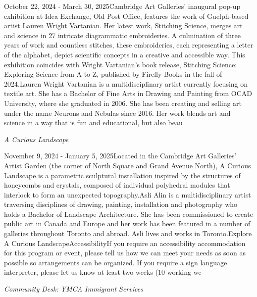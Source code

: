 \documentclass[letterpaper, 10pt]{article}
\newcommand{\subtitle}[1]{\textit{\large #1}\vspace{0.5em}}
\newcommand{\articlecontent}[1]{\small #1\vspace{1em}}
\begin{document}
\begin{multicols}{2}
{October 22, 2024 - March 30, 2025Cambridge Art Galleries' inaugural pop-up exhibition at Idea Exchange, Old Post Office, features the work of Guelph-based artist Lauren Wright Vartanian. Her latest work, Stitching Science, merges art and science in 27 intricate diagrammatic embroideries. A culmination of three years of work and countless stitches, these embroideries, each representing a letter of the alphabet, depict scientific concepts in a creative and accessible way. This exhibition coincides with Wright Vartanian’s book release, Stitching Science: Exploring Science from A to Z, published by Firefly Books in the fall of 2024.Lauren Wright Vartanian is a multidisciplinary artist currently focusing on textile art. She has a Bachelor of Fine Arts in Drawing and Painting from OCAD University, where she graduated in 2006. She has been creating and selling art under the name Neurons and Nebulas since 2016. Her work blends art and science in a way that is fun and educational, but also beau
}
\vspace{10px}

\subtitle{A Curious Landscape}

\articlecontent{

\qrcode[height=1.5cm]{https://ideaexchange.libnet.info/event/12212311}
\vspace{10px}

November 9, 2024 - January 5, 2025Located in the Cambridge Art Galleries' Artist Garden (the corner of North Square and Grand Avenue North), A Curious Landscape is a parametric sculptural installation inspired by the structures of honeycombs and crystals, composed of individual polyhedral modules that interlock to form an unexpected topography.Asli Alin is a multidisciplinary artist traversing disciplines of drawing, painting, installation and photography who holds a Bachelor of Landscape Architecture. She has been commissioned to create public art in Canada and Europe and her work has been featured in a number of galleries throughout Toronto and abroad. Asli lives and works in Toronto.Explore A Curious LandscapeAccessibilityIf you require an accessibility accommodation for this program or event, please tell us how we can meet your needs as soon as possible so arrangements can be organized. If you require a sign language interpreter, please let us know at least two-weeks (10 working we
}
\vspace{10px}

\subtitle{Community Desk: YMCA Immigrant Services}

\articlecontent{

}
\end{multicols}
\end{document}
